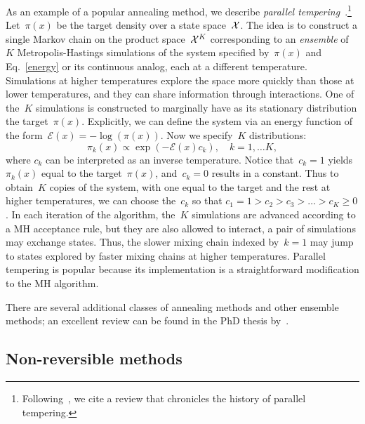 \documentclass[angelino.tex]{subfiles}
\begin{document}
As an example of a popular annealing method, we describe
\emph{parallel tempering}~\citep{iba:2001-ensemble}.\footnote{Following~\citet{murray-2007-thesis}, we cite a review that chronicles
the history of parallel tempering.}
Let~$\pi(x)$ be the target density over a state space~${\mathcal X}$.
The idea is to construct a single Markov chain on the product space~${\mathcal X}^K$
corresponding to an \emph{ensemble} of~$K$ Metropolis-Hastings
simulations of the system specified by~$\pi(x)$ and Eq.~\ref{energy} or its 
continuous analog, each at a different temperature.
Simulations at higher temperatures explore the space more quickly than those
at lower temperatures, and they can share information through interactions.
One of the~$K$ simulations is constructed to marginally have as its stationary 
distribution the target~$\pi(x)$.
Explicitly, we can define the system via an energy function of the
form~${\mathcal{E}(x) = -\log(\pi(x))}$.
Now we specify~$K$ distributions:
\[
\pi_k(x) \propto \exp(-\mathcal{E}(x) c_k), \quad k = 1, \dots K,
\]
where $c_k$ can be interpreted as an inverse temperature.
Notice that~$c_k = 1$ yields~$\pi_k(x)$ equal to the target~$\pi(x)$,
and~$c_k = 0$ results in a constant.
Thus to obtain~$K$ copies of the system, with one equal to the target and
the rest at higher temperatures, we can choose the~$c_k$ so that
${c_1 = 1 > c_2 > c_3 > \dots > c_K \ge 0}$.
In each iteration of the algorithm, the~$K$ simulations are advanced according
to a MH acceptance rule, but they are also allowed to interact,
\eg a pair of simulations may exchange states.
Thus, the slower mixing chain indexed by~$k=1$ may jump to
states explored by faster mixing chains at higher temperatures.
Parallel tempering is popular because its implementation is a straightforward
modification to the MH algorithm.

There are several additional classes of annealing methods and
other ensemble methods; an excellent review can be found in the PhD thesis 
by~\citet{murray-2007-thesis}.



\subsection{Non-reversible methods}
\end{document}
